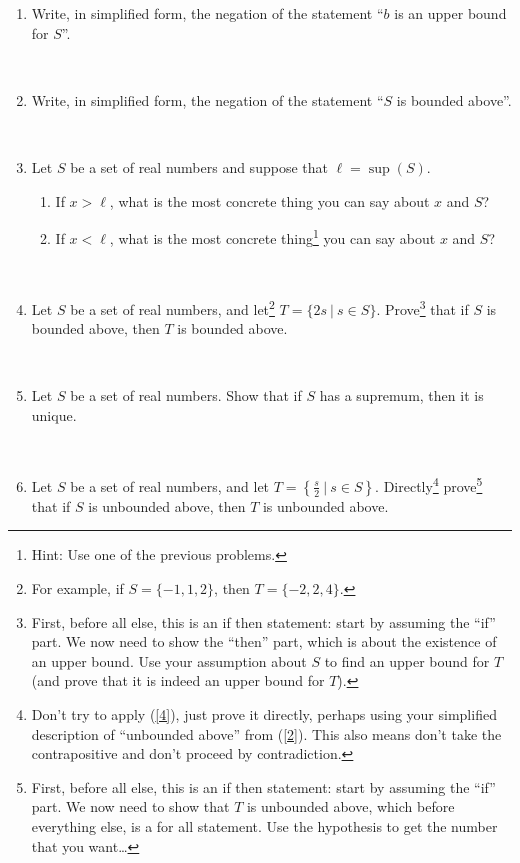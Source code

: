 \documentclass[12pt]{amsart}
\begin{document}
\begin{enumerate}
\item Write, in simplified form, the negation of the statement ``$b$ is an upper bound for $S$''.

\

\item\label{2} Write, in simplified form, the negation of the statement ``$S$ is bounded above''.

\

\item Let $S$ be a set of real numbers and suppose that $\ell=\sup(S)$. 
\begin{enumerate}
\item If $x > \ell$, what is the most concrete thing you can say about $x$ and $S$?
\item If $x < \ell$, what is the most concrete thing\footnote{Hint: Use one of the previous problems.} you can say about $x$ and $S$?
\end{enumerate}

\

\item\label{4} Let $S$ be a set of real numbers, and let\footnote{For example, if $S= \{-1,1,2\}$, then $T=\{-2,2,4\}$.} $T=\{ 2s \ | \ s\in S\}$. Prove\footnote{First, before all else, this is an if then statement: start by assuming the ``if'' part. We now need to show the ``then'' part, which is about the existence of an upper bound. Use your assumption about $S$ to find an upper bound for $T$ (and prove that it is indeed an upper bound for $T$).} that if $S$ is bounded above, then $T$ is bounded above.

\

\item Let $S$ be a set of real numbers. Show that if $S$ has a supremum, then it is unique.

\

\item Let $S$ be a set of real numbers, and let $\displaystyle T=\left\{ \frac{s}{2} \ | \ s\in S\right\}$. Directly\footnote{Don't try to apply (\ref{4}), just prove it directly, perhaps using your simplified description of ``unbounded above'' from (\ref{2}). This also means don't take the contrapositive and don't proceed by contradiction.} prove\footnote{First, before all else, this is an if then statement: start by assuming the ``if'' part. We now need to show that $T$ is unbounded above, which before everything else, is a for all statement. Use the hypothesis to get the number that you want\dots} that if $S$ is unbounded above, then $T$ is unbounded above.
\end{enumerate}
\end{document}
